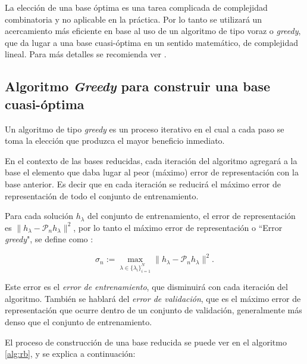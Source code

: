 La elección de una base óptima es una tarea complicada de complejidad combinatoria y no aplicable en la práctica. Por lo tanto se utilizará un acercamiento más eficiente en base al uso de un algoritmo de tipo voraz o \textit{greedy}, que da lugar a una base cuasi-óptima en un sentido matemático, de complejidad lineal. Para más detalles se recomienda ver \cite{Tiglio:2021ysj}.

\subsection{Algoritmo \textit{Greedy} para construir una base cuasi-óptima}

Un algoritmo de tipo \textit{greedy} es un proceso iterativo en el cual a cada paso se toma la elección que produzca el mayor beneficio inmediato.

En el contexto de las bases reducidas, cada iteración del algoritmo agregará a la base el elemento que daba lugar al peor (máximo) error de representación con la base anterior. Es decir que en cada iteración se reducirá el máximo error de representación de todo el conjunto de entrenamiento.

Para cada solución $h_{\lambda}$ del conjunto de entrenamiento, el error de representación es $\| h_{\lambda} - \mathcal{P}_nh_{\lambda} \|^2$, por lo tanto el máximo error de representación o ``Error \textit{greedy}", se define como :

\begin{equation}
\sigma_n := \max_{\lambda \in  \{ \lambda_{i}\}_{i=1}^N } \| h_{\lambda} - \mathcal{P}_nh_{\lambda} \|^2.
\end{equation}

Este error es el \textit{error de entrenamiento}, que disminuirá con cada iteración del algoritmo. También se hablará del \textit{error de validación}, que es el máximo error de representación que ocurre dentro de un conjunto de validación, generalmente más denso que el conjunto de entrenamiento.

El proceso de construcción de una base reducida se puede ver en el algoritmo \ref{alg:rb}, y se explica a continuación:

